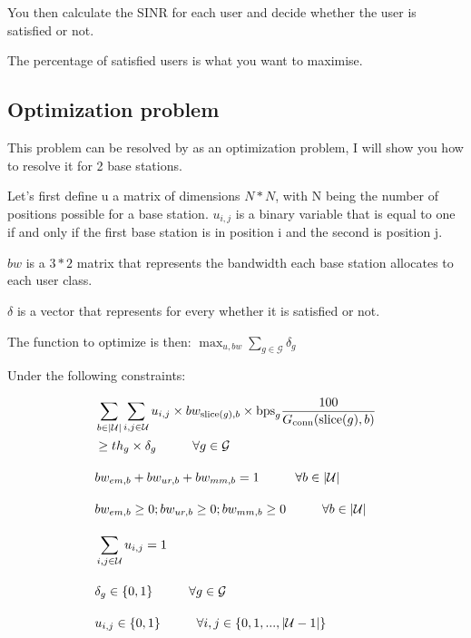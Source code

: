 \documentclass[letterpaper]{article}
\begin{document}
You then calculate the SINR for each user and decide whether the user is satisfied or not.

The percentage of satisfied users is what you want to maximise.

\subsection{Optimization problem}

This problem can be resolved by as an optimization problem, I will show you how to resolve it for 2 base stations.

Let's first define u a matrix of dimensions $N*N$, with N being the number of positions possible for a base station.
$u_{i,j}$ is a binary variable that is equal to one if and only if the first base station is in position i and the second is position j.

$bw$ is a $3*2$ matrix that represents the bandwidth each base station allocates to each user class.

$\delta$ is a vector that represents for every whether it is satisfied or not.

The function to optimize is then: $\max_{u,bw}\sum_{g\in\mathcal{G}}\delta_g$

Under the following constraints:

\begin{subequations}
    \allowdisplaybreaks
    \begin{align}
        & \sum_{b \in |\mathcal{U}|} \sum_{i, j \in \mathcal{U}} u_{i, j} \times bw_{\text{slice}(g), b} \times \text{bps}_g \frac{100}{G_{\text{conn}}(\text{slice}(g),b)} \nonumber \\
        & \geq th_g \times \delta_g \hspace{1cm} \forall g \in \mathcal{G} \\[1em]
        & bw_{em,b} + bw_{ur,b} + bw_{mm,b} = 1 \hspace{1cm} \forall b \in |\mathcal{U}| \\[1em]
        & bw_{em,b} \geq 0; bw_{ur,b} \geq 0; bw_{mm,b} \geq 0 \hspace{1cm} \forall b \in |\mathcal{U}| \\[1em]
        & \sum_{i,j \in \mathcal{U}}u_{i,j} = 1 \\[1em]
        & \delta_g \in \{0, 1\} \hspace{1cm} \forall g \in \mathcal{G} \\[1em] 
        & u_{i,j} \in \{0, 1\} \hspace{1cm} \forall i,j \in \{0, 1, ... , |\mathcal{U}-1|\}
    \end{align}\label{constr}
    \end{subequations}
\end{document}
